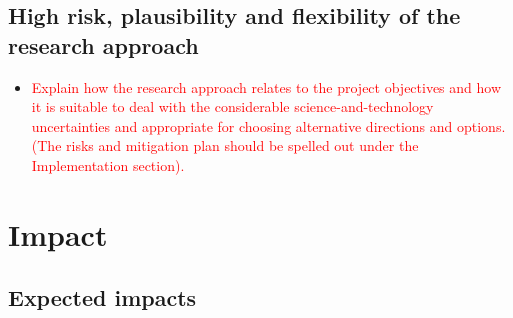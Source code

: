 \documentclass[11pt, a4paper]{article} %
\begin{document}

\subsection{High risk, plausibility and flexibility of the research approach}


\begin{itemize}
\item \textcolor{red}{Explain how the research approach relates to the
    project objectives and how it is suitable to deal with the
    considerable science-and-technology uncertainties and appropriate
    for choosing alternative directions and options. (The risks and
    mitigation plan should be spelled out under the Implementation
    section).}
\end{itemize}

\section{Impact}

\subsection{Expected impacts}
\end{document}
